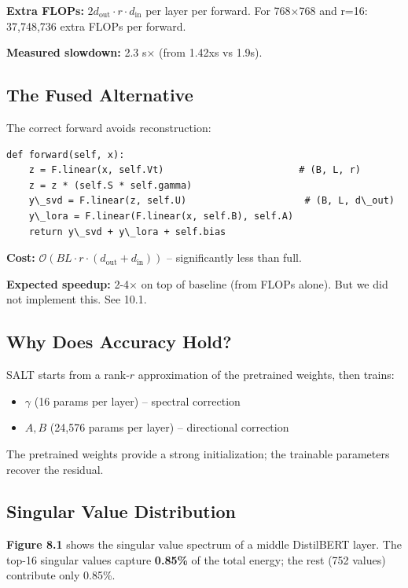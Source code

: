 \textbf{Extra FLOPs:} $2 d_\text{out} \cdot r \cdot d_\text{in}$ per layer per 
forward. For 768$\times$768 and r=16: 37,748,736 extra FLOPs per forward.

\textbf{Measured slowdown:} 2.3 s$\times$ (from 1.42xs vs 1.9s).

\subsection{The Fused Alternative}

The correct forward avoids reconstruction:

\begin{lstlisting}
def forward(self, x):
    z = F.linear(x, self.Vt)                        # (B, L, r)
    z = z * (self.S * self.gamma)
    y\_svd = F.linear(z, self.U)                     # (B, L, d\_out)
    y\_lora = F.linear(F.linear(x, self.B), self.A)
    return y\_svd + y\_lora + self.bias
\end{lstlisting}

\textbf{Cost:} $\mathcal{O}(BL \cdot r \cdot (d_\text{out} + d_\text{in}))$ -- 
significantly less than full.

\textbf{Expected speedup:} 2-4$\times$ on top of baseline (from FLOPs alone). But we did 
not implement this. See  10.1.

\subsection{Why Does Accuracy Hold?}

SALT starts from a rank-$r$ approximation of the pretrained weights, then 
trains:

\begin{itemize}
\item $\gamma$ (16 params per layer) -- spectral correction
\item $A, B$ (24,576 params per layer) -- directional correction

\end{itemize}
The pretrained weights provide a strong initialization; the trainable 
parameters recover the residual.

\subsection{Singular Value Distribution}

\textbf{Figure 8.1} shows the singular value spectrum of a middle DistilBERT 
layer. The top-16 singular values capture \textbf{0.85\%} of the 
total energy; the rest (752 values) contribute only 0.85\%.

